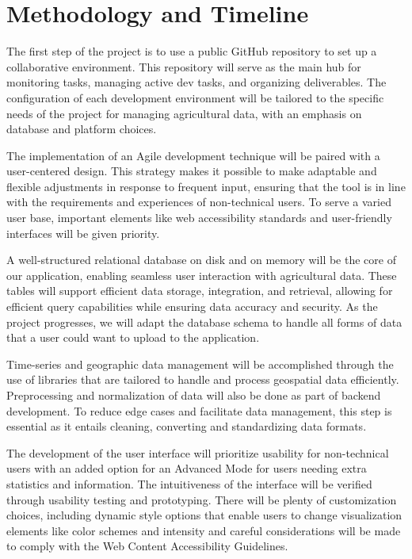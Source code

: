 \documentclass[12pt]{article}
\begin{document}
\section*{Methodology and Timeline}
The first step of the project is to use a public GitHub repository to set up a collaborative environment. This repository will serve as the main hub for monitoring tasks, managing active dev tasks, and organizing deliverables. The configuration of each development environment will be tailored to the specific needs of the project for managing agricultural data, with an emphasis on database and platform choices.  

The implementation of an Agile development technique will be paired with a user-centered design. This strategy makes it possible to make adaptable and flexible adjustments in response to frequent input, ensuring that the tool is in line with the requirements and experiences of non-technical users. To serve a varied user base, important elements like web accessibility standards and user-friendly interfaces will be given priority. 

A well-structured relational database on disk and on memory will be the core of our application, enabling seamless user interaction with agricultural data. These tables will support efficient data storage, integration, and retrieval, allowing for efficient query capabilities while ensuring data accuracy and security. As the project progresses, we will adapt the database schema to handle all forms of data that a user could want to upload to the application. 

Time-series and geographic data management will be accomplished through the use of libraries that are tailored to handle and process geospatial data efficiently. Preprocessing and normalization of data will also be done as part of backend development. To reduce edge cases and facilitate data management, this step is essential as it entails cleaning, converting and standardizing data formats.  

The development of the user interface will prioritize usability for non-technical users with an added option for an Advanced Mode for users needing extra statistics and information. The intuitiveness of the interface will be verified through usability testing and prototyping. There will be plenty of customization choices, including dynamic style options that enable users to change visualization elements like color schemes and intensity and careful considerations will be made to comply with the Web Content Accessibility Guidelines.  
\end{document}
